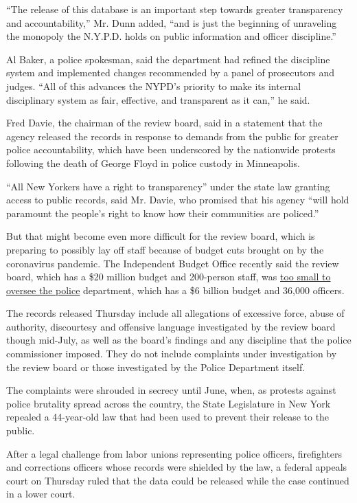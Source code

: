 ``The release of this database is an important step towards greater
transparency and accountability,'' Mr. Dunn added, ``and is just the
beginning of unraveling the monopoly the N.Y.P.D. holds on public
information and officer discipline.''

Al Baker, a police spokesman, said the department had refined the
discipline system and implemented changes recommended by a panel of
prosecutors and judges. ``All of this advances the NYPD's priority to
make its internal disciplinary system as fair, effective, and
transparent as it can,'' he said.

Fred Davie, the chairman of the review board, said in a statement that
the agency released the records in response to demands from the public
for greater police accountability, which have been underscored by the
nationwide protests following the death of George Floyd in police
custody in Minneapolis.

``All New Yorkers have a right to transparency'' under the state law
granting access to public records, said Mr. Davie, who promised that his
agency ``will hold paramount the people's right to know how their
communities are policed.''

But that might become even more difficult for the review board, which is
preparing to possibly lay off staff because of budget cuts brought on by
the coronavirus pandemic. The Independent Budget Office recently said
the review board, which has a \$20 million budget and 200-person staff,
was
\href{https://www.nydailynews.com/new-york/nyc-crime/ny-nypd-watchdog-agency-budget-cut-layoffs-20200812-3w2hbgkgnfhybkjawmuucrc5qm-story.html}{too
small to oversee the police} department, which has a \$6 billion budget
and 36,000 officers.

The records released Thursday include all allegations of excessive
force, abuse of authority, discourtesy and offensive language
investigated by the review board though mid-July, as well as the board's
findings and any discipline that the police commissioner imposed. They
do not include complaints under investigation by the review board or
those investigated by the Police Department itself.

The complaints were shrouded in secrecy until June, when, as protests
against police brutality spread across the country, the State
Legislature in New York repealed a 44-year-old law that had been used to
prevent their release to the public.

After a legal challenge from labor unions representing police officers,
firefighters and corrections officers whose records were shielded by the
law, a federal appeals court on Thursday ruled that the data could be
released while the case continued in a lower court.

